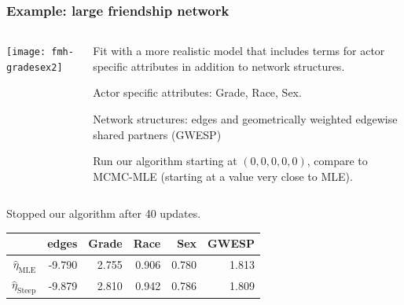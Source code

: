 \documentclass[slidestop,compress, 10pt]{beamer}
\newcommand{\etaMLE}{\hat{\eta}_{\textrm{MLE}}}
\begin{document}
\frame
{
  \frametitle{Example: large friendship network}  
\begin{columns}[t]
\begin{column}[T]{0.3\textwidth}
\texttt{[image: fmh-gradesex2]}
\end{column}

\begin{column}[T]{0.7\textwidth}
Fit with a more realistic model that includes terms for actor 
specific attributes in addition to network structures.  

Actor specific attributes: Grade, Race, Sex.
\vspace{2mm}

Network structures: edges and geometrically weighted edgewise shared partners (GWESP)
\vspace{2mm}

Run our algorithm starting at $(0,0,0,0,0)$, compare to MCMC-MLE (starting at a value very close to MLE).
\end{column}
\end{columns}
\vspace{1mm}

Stopped our algorithm after 40 updates.
\begin{table}
\begin{center} 
\begin{tabular}{rrrrrr}
  \hline
 & edges & Grade & Race & Sex & GWESP \\ 
  \hline
$\etaMLE$ & -9.790 & 2.755 & 0.906 & 0.780 & 1.813 \\ 
$\hat{\eta}_{\textrm{Steep}}$ & -9.879 & 2.810 & 0.942 & 0.786 & 1.809 \\ 
   \hline
\end{tabular}\label{T:FauxMagnolia}
\end{center}
\end{table}
}
\end{document}
